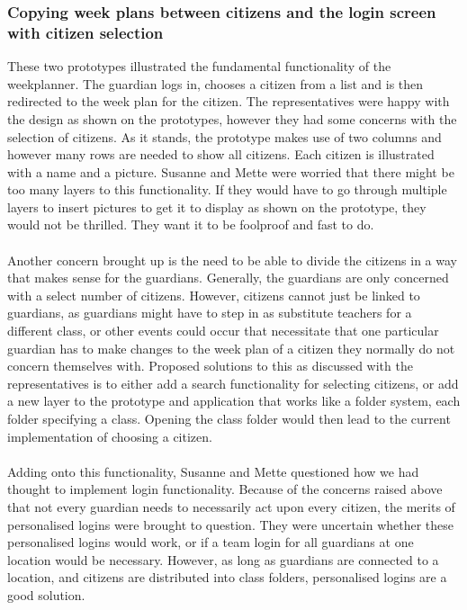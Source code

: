\subsubsection{Copying week plans between citizens and the login screen with citizen selection}
These two prototypes illustrated the fundamental functionality of the weekplanner.
The guardian logs in, chooses a citizen from a list and is then redirected to the week plan for the citizen.
The representatives were happy with the design as shown on the prototypes, however they had some concerns with the selection of citizens.
As it stands, the prototype makes use of two columns and however many rows are needed to show all citizens.
Each citizen is illustrated with a name and a picture.
Susanne and Mette were worried that there might be too many layers to this functionality.
If they would have to go through multiple layers to insert pictures to get it to display as shown on the prototype, they would not be thrilled.
They want it to be foolproof and fast to do.
\\\\
Another concern brought up is the need to be able to divide the citizens in a way that makes sense for the guardians.
Generally, the guardians are only concerned with a select number of citizens.
However, citizens cannot just be linked to guardians, as guardians might have to step in as substitute teachers for a different class, or other events could occur that necessitate that one particular guardian has to make changes to the week plan of a citizen they normally do not concern themselves with.
Proposed solutions to this as discussed with the representatives is to either add a search functionality for selecting citizens, or add a new layer to the prototype and application that works like a folder system, each folder specifying a class.
Opening the class folder would then lead to the current implementation of choosing a citizen.
\\\\
Adding onto this functionality, Susanne and Mette questioned how we had thought to implement login functionality.
Because of the concerns raised above that not every guardian needs to necessarily act upon every citizen, the merits of personalised logins were brought to question.
They were uncertain whether these personalised logins would work, or if a team login for all guardians at one location would be necessary.
However, as long as guardians are connected to a location, and citizens are distributed into class folders, personalised logins are a good solution.
